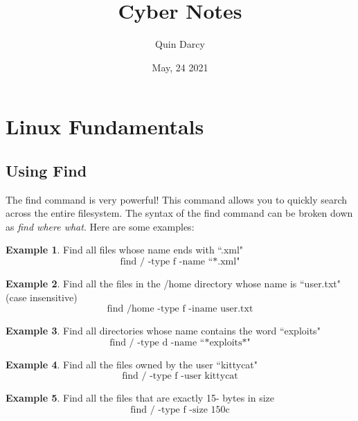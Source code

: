 \documentclass[12pt]{article}
\theoremstyle{definition}
\theoremstyle{definition}
\newtheorem{exmp}{Example}[section]
\begin{document}
\title{Cyber Notes}
\author{Quin Darcy}
\date{May, 24 2021}
\maketitle
\tableofcontents\newpage
\section{Linux Fundamentals}
    \subsection{Using Find}
        The find command is very powerful! This command allows you to quickly
        search across the entire filesystem. The syntax of the find command can
        be broken down as \textit{find where what}. Here are some examples:
        \begin{exmp}
            Find all files whose name ends with ``.xml"
            \begin{equation*}
                \text{find / -type f -name ``*.xml"}
            \end{equation*}
        \end{exmp}
        \begin{exmp}
            Find all the files in the /home directory whose name is
            ``user.txt" (case insensitive)
            \begin{equation*}
                \text{find /home -type f -iname user.txt}
            \end{equation*}
        \end{exmp}
        \begin{exmp}
            Find all directories whose name contains the word ``exploits"
            \begin{equation*}
                \text{find / -type d -name ``*exploits*"}
            \end{equation*}
        \end{exmp}
        \begin{exmp}
            Find all the files owned by the user ``kittycat"
            \begin{equation*}
                \text{find / -type f -user kittycat}
            \end{equation*}
        \end{exmp}
        \begin{exmp}
            Find all the files that are exactly 15- bytes in size
            \begin{equation*}
                \text{find / -type f -size 150c}
            \end{equation*}
        \end{exmp}
\end{document}
